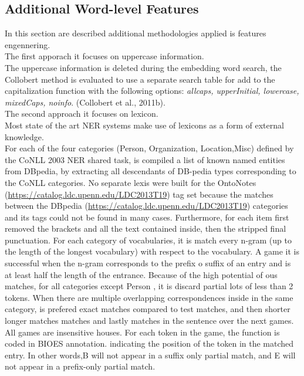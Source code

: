 \documentclass[twocolumn,10pt]{wmrDoc}
\begin{document}
\subsection{Additional Word-level Features}
In this section are described additional methodologies applied is features engennering.\\
The first apporach it focuses on uppercase information.\\
The uppercase information is deleted during the embedding word search, the Collobert method is evaluated to use a separate search table for add to the capitalization function with the following options: \textit{allcaps, upperInitial, lowercase, mixedCaps, noinfo}.
\cite{DBLP:conf/aaai/BordesWCB11}(Collobert et al., 2011b).\\
The second approach it focuses on lexicon.\\
Most state of the art NER systems make use of lexicons as a form of external knowledge.\\
For   each   of   the   four   categories   (Person, Organization, Location,Misc)  defined  by the CoNLL 2003 NER shared task, is compiled a list  of  known  named  entities  from  DBpedia,  by extracting all descendants of DB-pedia  types  corresponding  to  the  CoNLL  categories.
No separate lexis were built for the OntoNotes (\url{https://catalog.ldc.upenn.edu/LDC2013T19}) tag set because the matches between the DBpedia (\url{https://catalog.ldc.upenn.edu/LDC2013T19}) categories and its tags could not be found in many cases. Furthermore, for each item first removed the brackets and all the text contained inside, then the stripped final punctuation.
For each category of vocabularies, it is match every n-gram (up to the length of the longest vocabulary) with respect to the vocabulary. A game it is successful when the n-gram corresponds to the prefix o suffix of an entry and is at least half the length of the entrance. Because of the high potential of ous matches, for all categories except Person , it is discard partial lots of less than 2 tokens.
When there are multiple overlapping correspondences inside
in the same category, is prefered exact matches compared to test matches, and then shorter longer matches
matches and lastly matches in the sentence over the next games.
All games are insensitive houses.
For each token in the game, the function is coded  in  BIOES annotation.
indicating the position of the token in the matched entry. In other words,B will not appear in a suffix only partial match, and E will not appear in a prefix-only partial match.
\end{document}
